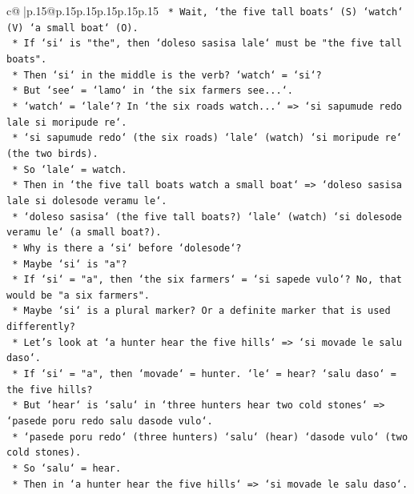 \documentclass{article}
\begin{document}
{\begin{supertabular}{c@{$\;$}|p{.15\linewidth}@{}p{.15\linewidth}p{.15\linewidth}p{.15\linewidth}p{.15\linewidth}p{.15\linewidth}}
{{{\texttt{                *   Wait, `the five tall boats` (S) `watch` (V) `a small boat` (O).} \\
\texttt{                *   If `si` is "the", then `doleso sasisa lale` must be "the five tall boats".} \\
\texttt{                *   Then `si` in the middle is the verb? `watch` = `si`?} \\
\texttt{                *   But `see` = `lamo` in `the six farmers see...`.} \\
\texttt{                *   `watch` = `lale`? In `the six roads watch...` => `si sapumude redo lale si moripude re`.} \\
\texttt{                *   `si sapumude redo` (the six roads) `lale` (watch) `si moripude re` (the two birds).} \\
\texttt{                *   So `lale` = watch.} \\
\texttt{                *   Then in `the five tall boats watch a small boat` => `doleso sasisa lale si dolesode veramu le`.} \\
\texttt{                *   `doleso sasisa` (the five tall boats?) `lale` (watch) `si dolesode veramu le` (a small boat?).} \\
\texttt{                *   Why is there a `si` before `dolesode`?} \\
\texttt{                *   Maybe `si` is "a"?} \\
\texttt{                *   If `si` = "a", then `the six farmers` = `si sapede vulo`? No, that would be "a six farmers".} \\
\texttt{                *   Maybe `si` is a plural marker? Or a definite marker that is used differently?} \\
\texttt{                *   Let's look at `a hunter hear the five hills` => `si movade le salu daso`.} \\
\texttt{                *   If `si` = "a", then `movade` = hunter. `le` = hear? `salu daso` = the five hills?} \\
\texttt{                *   But `hear` is `salu` in `three hunters hear two cold stones` => `pasede poru redo salu dasode vulo`.} \\
\texttt{                *   `pasede poru redo` (three hunters) `salu` (hear) `dasode vulo` (two cold stones).} \\
\texttt{                *   So `salu` = hear.} \\
\texttt{                *   Then in `a hunter hear the five hills` => `si movade le salu daso`.} \\
}}}
\end{supertabular}}
\end{document}
